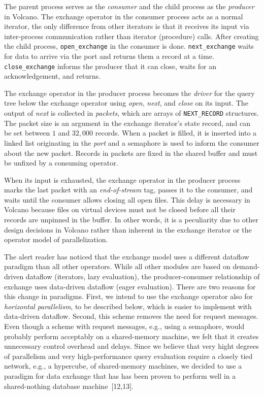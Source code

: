 \documentclass[a4paper,12pt,notitlepage,twoside,openright]{article}
\begin{document}
The parent process serves as the \emph{consumer} and the
child process as the \emph{producer} in Volcano. The exchange
operator in the consumer process acts as a normal iterator,
the only difference from other iterators is that it receives its
input via inter-process communication rather than iterator
(procedure) calls. After creating the child process,
\texttt{open\_exchange} in the consumer is done. \texttt{next\_exchange}
waits for data to arrive via the port and returns them a
record at a time. \texttt{close\_exchange} informs the producer that
it can close, waits for an acknowledgement, and returns.

The exchange operator in the producer process
becomes the \emph{driver} for the query tree below the exchange
operator using \emph{open}, \emph{next}, and \emph{close} on its input. The output
of \emph{next} is collected in \emph{packets}, which are arrays of
\texttt{NEXT\_RECORD} structures. The packet size is an argument
in the exchange iterator's state record, and can be set
between \(1\) and \(32,000\) records. When a packet is filled, it
is inserted into a linked list originating in the \emph{port} and a
semaphore is used to inform the consumer about the new
packet. Records in packets are fixed in the shared buffer
and must be unfixed by a consuming operator.

When its input is exhausted, the exchange operator in
the producer process marks the last packet with an \emph{end-of-stream}
tag, passes it to the consumer, and waits until the
consumer allows closing all open files. This delay is
necessary in Volcano because files on virtual devices must
not be closed before all their records are unpinned in the
buffer. In other words, it is a peculiarity due to other
design decisions in Volcano rather than inherent in the
exchange iterator or the operator model of parallelization.

The alert reader has noticed that the exchange model
uses a different dataflow paradigm than all other operators.
While all other modules are based on demand-driven
dataflow (iterators, lazy evaluation), the producer-consumer
relationship of exchange uses data-driven dataflow (eager
evaluation). There are two reasons for this change in paradigms.
First, we intend to use the exchange operator also
for \emph{horizontal parallelism}, to be described below, which is
easier to implement with data-driven dataflow. Second, this
scheme removes the need for request messages. Even
though a scheme with request messages, e.g., using a semaphore,
would probably perform acceptably on a shared-memory
machine, we felt that it creates unnecessary control
overhead and delays. Since we believe that very hight
degrees of parallelism and very high-performance query
evaluation require a closely tied network, e.g., a hypercube,
of shared-memory machines, we decided to use a paradigm
for data exchange that has has been proven to perform well
in a shared-nothing database machine~{[12,13]}.
\end{document}

